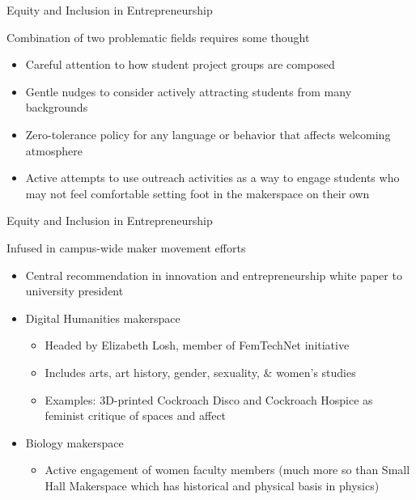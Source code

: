 \documentclass[xcolor=table,compress,professionalfonts,pdfpagelabels]{beamer}
\begin{document}
\begin{frame}{Equity and Inclusion in Entrepreneurship}
 \begin{block}{Combination of two problematic fields requires some thought}
  \begin{itemize}
   \item Careful attention to how student project groups are composed
   \item Gentle nudges to consider actively attracting students from many backgrounds
   \item Zero-tolerance policy for any language or behavior that affects welcoming atmosphere
   \item Active attempts to use outreach activities as a way to engage students who may not feel comfortable setting foot in the makerspace on their own
  \end{itemize}
 \end{block}
\end{frame}

\begin{frame}{Equity and Inclusion in Entrepreneurship}
 \begin{block}{Infused in campus-wide maker movement efforts}
  \begin{itemize}
   \item Central recommendation in innovation and entrepreneurship white paper to university president
   \item Digital Humanities makerspace
    \begin{itemize}
     \item Headed by Elizabeth Losh, member of FemTechNet initiative
     \item Includes arts, art history, gender, sexuality, \& women's studies
     \item Examples: 3D-printed Cockroach Disco and Cockroach Hospice as feminist critique of spaces and affect
    \end{itemize}
   \item Biology makerspace
    \begin{itemize}
     \item Active engagement of women faculty members (much more so than Small Hall Makerspace which has historical and physical basis in physics)
    \end{itemize}
  \end{itemize}
 \end{block}
\end{frame}
\end{document}
